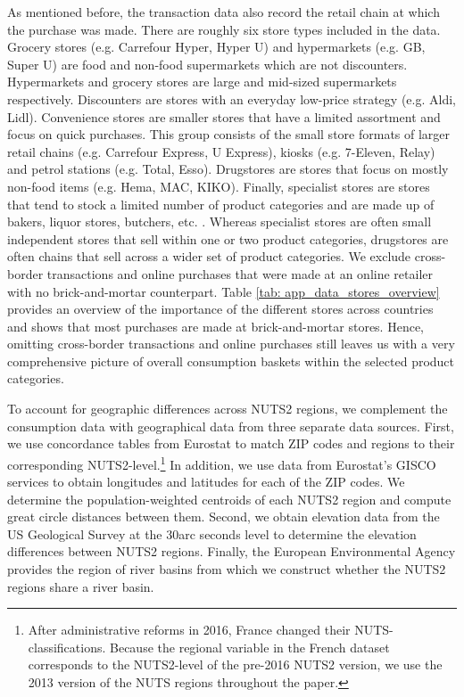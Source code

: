 As mentioned before, the transaction data also record the retail chain at which the purchase was made. There are roughly six store types included in the data. Grocery stores (e.g. Carrefour Hyper, Hyper U) and hypermarkets (e.g. GB, Super U) are food and non-food supermarkets which are not discounters. Hypermarkets and grocery stores are large and mid-sized supermarkets respectively. Discounters are stores with an everyday low-price strategy (e.g. Aldi, Lidl). Convenience stores are smaller stores that have a limited assortment and focus on quick purchases. This group consists of the small store formats of larger retail chains (e.g. Carrefour Express, U Express), kiosks (e.g. 7-Eleven, Relay) and petrol stations (e.g. Total, Esso). Drugstores are stores that focus on mostly non-food items (e.g. Hema, MAC, KIKO). Finally, specialist stores are stores that tend to stock a limited number of product categories and are made up of bakers, liquor stores, butchers, etc. . Whereas specialist stores are often small independent stores that sell within one or two product categories, drugstores are often chains that sell across a wider set of product categories. We exclude cross-border transactions and online purchases that were made at an online retailer with no brick-and-mortar counterpart. Table \ref{tab: app_data_stores_overview} provides an overview of the importance of the different stores across countries and shows that most purchases are made at brick-and-mortar stores. Hence, omitting cross-border transactions and online purchases still leaves us with a very comprehensive picture of overall consumption baskets within the selected product categories. 

To account for geographic differences across NUTS2 regions, we complement the consumption data with geographical data from three separate data sources. First, we use concordance tables from Eurostat to match ZIP codes and regions to their corresponding NUTS2-level.\footnote{After administrative reforms in 2016, France changed their NUTS-classifications. Because the regional variable in the French dataset corresponds to the NUTS2-level of the pre-2016 NUTS2 version, we use the 2013 version of the NUTS regions throughout the paper.} In addition, we use data from Eurostat's GISCO services to obtain longitudes and latitudes for each of the ZIP codes. We determine the population-weighted centroids of each NUTS2 region and compute great circle distances between them. Second, we obtain elevation data from the US Geological Survey at the 30arc seconds level to determine the elevation differences between NUTS2 regions. Finally, the European Environmental Agency provides the region of river basins from which we construct whether the NUTS2 regions share a river basin. 